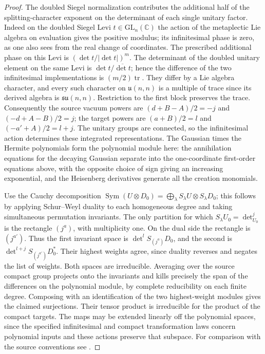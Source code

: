 \begin{proof}
The doubled Siegel normalization contributes the additional half of
the splitting-character exponent on the determinant of each single
unitary factor. Indeed on the doubled Siegel Levi \(t\in
\mathrm{GL}_n(\mathbb C)\) the action of the metaplectic Lie algebra
on evaluation gives the positive modulus; its infinitesimal phase
is zero, as one also sees from the real change of coordinates.
The prescribed additional phase on this Levi is
\((\det t/|\det t|)^m\). The determinant of the doubled unitary
element on the same Levi is \(\det t/\overline{\det t}\); hence the
difference of the two infinitesimal implementations is
\((m/2)\operatorname{tr}\). They differ by a Lie algebra character,
and every such character on \(\mathfrak u(n,n)\) is a multiple of
trace since its derived algebra is \(\mathfrak{su}(n,n)\).
Restriction to the first block preserves the trace. Consequently the
source vacuum powers are \((d+B-A)/2=-j\) and
\((-d+A-B)/2=j\); the target powers are \((a+B)/2=l\) and
\((-a'+A)/2=l+j\). The unitary groups are connected, so the
infinitesimal action determines these integrated representations.
The Gaussian times the Hermite polynomials form the polynomial
module here: the annihilation equations for the decaying Gaussian
separate into the one-coordinate first-order equations above, with
the opposite choice of sign giving an increasing exponential, and
the Heisenberg derivatives generate all the creation monomials.

Use the Cauchy decomposition
\(\operatorname{Sym}(U\otimes D_0)=
\bigoplus_\lambda S_\lambda U\otimes S_\lambda D_0\);
this follows by applying Schur--Weyl duality to each homogeneous
degree and taking simultaneous permutation invariants.
The only partition for which \(S_\lambda U_0=\det_{U_0}^j\) is the
rectangle \((j^a)\), with multiplicity one. On the dual side the
rectangle is \((j^{a'})\). Thus the first invariant space is
\(\det^l S_{(j^a)}D_0\), and the second is
\(\det^{l+j} S_{(j^{a'})} D_0^*\). Their highest weights agree,
since duality reverses and negates the list of weights. Both spaces
are irreducible. Averaging over the source compact group projects
onto the invariants and kills precisely the span of the differences
on the polynomial module, by complete reducibility on each finite
degree. Composing with an identification of the two highest-weight
modules gives the claimed surjections. Their tensor product is
irreducible for the product of the compact targets. The maps may
be extended linearly off the polynomial spaces, since the
specified infinitesimal and compact transformation laws concern
polynomial inputs and these actions preserve that subspace.
For comparison with the source conventions see
.
\end{proof}

